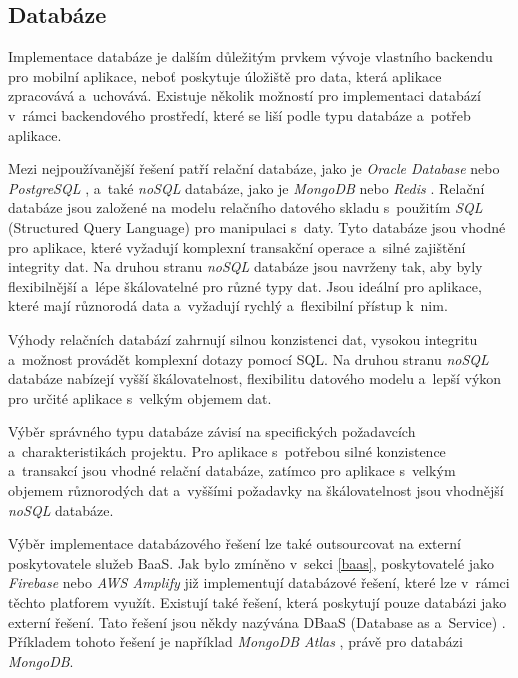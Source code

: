\subsection{Databáze}

Implementace databáze je dalším důležitým prvkem vývoje vlastního backendu pro mobilní aplikace, neboť poskytuje úložiště pro data, která aplikace zpracovává a~uchovává. Existuje několik možností pro implementaci databází v~rámci backendového prostředí, které se liší podle typu databáze a~potřeb aplikace.

Mezi nejpoužívanější řešení patří relační databáze, jako je \emph{Oracle Database} \cite{oracle-database} nebo \emph{PostgreSQL} \cite{postgresql}, a~také \emph{noSQL} databáze, jako je \emph{MongoDB} \cite{mongodb} nebo \emph{Redis} \cite{redis}. Relační databáze jsou založené na modelu relačního datového skladu s~použitím \emph{SQL} (Structured Query Language) pro manipulaci s~daty. Tyto databáze jsou vhodné pro aplikace, které vyžadují komplexní transakční operace a~silné zajištění integrity dat. Na druhou stranu \emph{noSQL} databáze jsou navrženy tak, aby byly flexibilnější a~lépe škálovatelné pro různé typy dat. Jsou ideální pro aplikace, které mají různorodá data a~vyžadují rychlý a~flexibilní přístup k~nim.

Výhody relačních databází zahrnují silnou konzistenci dat, vysokou integritu a~možnost provádět komplexní dotazy pomocí SQL. Na druhou stranu \emph{noSQL} databáze nabízejí vyšší škálovatelnost, flexibilitu datového modelu a~lepší výkon pro určité aplikace s~velkým objemem dat. \cite{fit-lecture-no-sql}

Výběr správného typu databáze závisí na specifických požadavcích a~charakteristikách projektu. Pro aplikace s~potřebou silné konzistence a~transakcí jsou vhodné relační databáze, zatímco pro aplikace s~velkým objemem různorodých dat a~vyššími požadavky na škálovatelnost jsou vhodnější \emph{noSQL} databáze.

Výběr implementace databázového řešení lze také outsourcovat na externí poskytovatele služeb BaaS. Jak bylo zmíněno v~sekci \ref{baas}, poskytovatelé jako \emph{Firebase} \cite{firebase} nebo \emph{AWS Amplify} \cite{aws-amplify} již implementují databázové řešení, které lze v~rámci těchto platforem využít. Existují také řešení, která poskytují pouze databázi jako externí řešení. Tato řešení jsou někdy nazývána DBaaS (Database as a~Service) \cite{mongodb-dbaas}. Příkladem tohoto řešení je například \emph{MongoDB Atlas} \cite{mongodb-atlas}, právě pro databázi \emph{MongoDB}.

